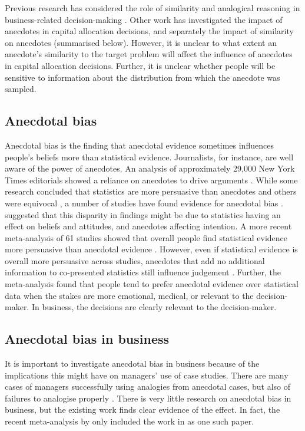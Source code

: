 \documentclass[a4paper, nobind, dvipsnames]{templates/ociamthesis}
\theoremstyle{definition}
\theoremstyle{definition}
\theoremstyle{definition}
\theoremstyle{definition}
\theoremstyle{remark}
\begin{document}
Previous research has considered the role of similarity and analogical reasoning
in business-related decision-making \autocite[e.g.,][]{gavetti2005}. Other work has
investigated the impact of anecdotes in capital allocation decisions, and
separately the impact of similarity on anecdotes (summarised below). However, it
is unclear to what extent an anecdote's similarity to the target problem will
affect the influence of anecdotes in capital allocation decisions. Further, it
is unclear whether people will be sensitive to information about the
distribution from which the anecdote was sampled.

\subsection{Anecdotal bias}

Anecdotal bias is the finding that anecdotal evidence sometimes influences
people's beliefs more than statistical evidence. Journalists, for instance, are
well aware of the power of anecdotes. An analysis of approximately 29,000 New
York Times editorials showed a reliance on anecdotes to drive arguments
\autocite{alkhatib2017}. While some research concluded that statistics are more
persuasive than anecdotes \autocites[e.g.,][]{allen1997,hornikx2005,hoeken2001} and
others were equivocal \autocite{winterbottom2008}, a number of studies have found
evidence for anecdotal bias \autocites[e.g.,][]{reinard1988,shen2015,jaramillo2019,ratcliff2020,reinhart2006}. \textcite{zebregs2015} suggested that this disparity in
findings might be due to statistics having an effect on beliefs and attitudes,
and anecdotes affecting intention. A more recent meta-analysis of 61 studies
showed that overall people find statistical evidence more persuasive than
anecdotal evidence \autocite{freling2020}. However, even if statistical evidence is
overall more persuasive across studies, anecdotes that add no additional
information to co-presented statistics still influence judgement
\autocite{jaramillo2019}. Further, the meta-analysis found that people tend to prefer
anecdotal evidence over statistical data when the stakes are more emotional,
medical, or relevant to the decision-maker. In business, the decisions are
clearly relevant to the decision-maker.

\subsection{Anecdotal bias in business}

It is important to investigate anecdotal bias in business because of the
implications this might have on managers' use of case studies. There are many
cases of managers successfully using analogies from anecdotal cases, but also of
failures to analogise properly \autocite{gavetti2005,gavetti2005a}. There is very
little research on anecdotal bias in business, but the existing work finds clear
evidence of the effect. In fact, the recent meta-analysis by \textcite{freling2020} only
included the work in \textcite{wainberg2013} as one such paper.
\end{document}

